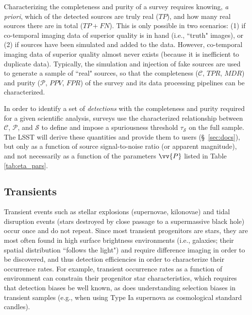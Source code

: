 \documentclass[DM,lsstdraft,toc]{lsstdoc}
\begin{document}
Characterizing the completeness and purity of a survey requires knowing, {\em a priori}, which of the detected sources are truly real ($\mathit{TP}$), and how many real sources there are in total ($\mathit{TP}+\mathit{FN}$). This is only possible in two scenarios: (1) if co-temporal imaging data of superior quality is in hand (i.e., ``truth" images), or (2) if sources have been simulated and added to the data. However, co-temporal imaging data of superior quality almost never exists (because it is inefficient to duplicate data). Typically, the simulation and injection of fake sources are used to generate a sample of ``real" sources, so that the completeness ($\mathcal{C}$, $\mathit{TPR}$, $\mathit{MDR}$) and purity ($\mathcal{P}$, $\mathit{PPV}$, $\mathit{FPR}$) of the survey and its data processing pipelines can be characterized. 

In order to identify a set of {\it detections} with the completeness and purity required for a given scientific analysis, surveys use the characterized relationship between $\mathcal{C}$, $\mathcal{P}$, and $\mathcal{S}$ to define and impose a spuriousness threshold $\tau_{\mathcal{S}}$ on the full sample. The LSST will derive these quantities and provide them to users (\S~\ref{sec:docs}), but only as a function of source signal-to-noise ratio (or apparent magnitude), and not necessarily as a function of the parameters $\vv{P}$ listed in Table \ref{tab:eta_pars}.

\subsection{Transients}\label{ssec:sci_trans}

Transient events such as stellar explosions (supernovae, kilonovae) and tidal disruption events (stars destroyed by close passage to a supermassive black hole) occur once and do not repeat. Since most transient progenitors are stars, they are most often found in high surface brightness environments (i.e., galaxies; their spatial distribution ``follows the light") and require difference imaging in order to be discovered, and thus detection efficiencies in order to characterize their occurrence rates. For example, transient occurrence rates as a function of environment can constrain their progenitor star characteristics, which requires that detection biases be well known, as does understanding selection biases in transient samples (e.g., when using Type Ia supernova as cosmological standard candles). 
\end{document}
